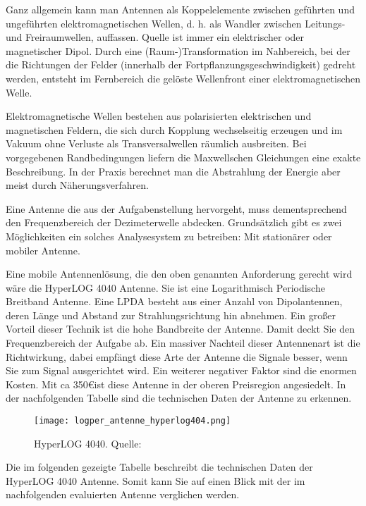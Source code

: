 Ganz allgemein kann man Antennen als Koppelelemente zwischen geführten und ungeführten elektromagnetischen Wellen, d. h. als Wandler zwischen Leitungs- und Freiraumwellen, auffassen. Quelle ist immer ein elektrischer oder magnetischer Dipol. Durch eine (Raum-)Transformation im Nahbereich, bei der die Richtungen der Felder (innerhalb der Fortpflanzungsgeschwindigkeit) gedreht werden, entsteht im Fernbereich die gelöste Wellenfront einer elektromagnetischen Welle. 

Elektromagnetische Wellen bestehen aus polarisierten elektrischen und magnetischen Feldern, die sich durch Kopplung wechselseitig erzeugen und im Vakuum ohne Verluste als Transversalwellen räumlich ausbreiten. Bei vorgegebenen Randbedingungen liefern die Maxwellschen Gleichungen eine exakte Beschreibung. In der Praxis berechnet man die Abstrahlung der Energie aber meist durch Näherungsverfahren. 

Eine Antenne die aus der Aufgabenstellung hervorgeht, muss dementsprechend den Frequenzbereich der Dezimeterwelle abdecken. Grundsätzlich gibt es zwei Möglichkeiten ein solches Analysesystem zu betreiben: Mit stationärer oder mobiler Antenne.

Eine mobile Antennenlösung, die den oben genannten Anforderung gerecht wird wäre die HyperLOG 4040 Antenne. Sie ist eine Logarithmisch Periodische Breitband Antenne. Eine LPDA besteht aus einer Anzahl von Dipolantennen, deren Länge und Abstand zur Strahlungsrichtung hin abnehmen. Ein großer Vorteil dieser Technik ist die hohe Bandbreite der Antenne. Damit deckt Sie den Frequenzbereich der Aufgabe ab. Ein massiver Nachteil dieser Antennenart ist die Richtwirkung, dabei empfängt diese Arte der Antenne die Signale besser, wenn Sie zum Signal ausgerichtet wird. Ein weiterer negativer Faktor sind die enormen Kosten. Mit ca 350\euro ist diese Antenne in der oberen Preisregion angesiedelt. In der nachfolgenden Tabelle sind die technischen Daten der Antenne zu erkennen. 

\begin{figure}[H]
	\centering
	\texttt{[image: logper\_antenne\_hyperlog404.png]}
	\caption[HyperLOG 4040]{HyperLOG 4040. Quelle: \cite{Funktechnik:2018}} 
	\label{HyperLOG 4040}
\end{figure}  

Die im folgenden gezeigte Tabelle beschreibt die technischen Daten der HyperLOG 4040 Antenne. Somit kann Sie auf einen Blick mit der im nachfolgenden evaluierten Antenne verglichen werden.

